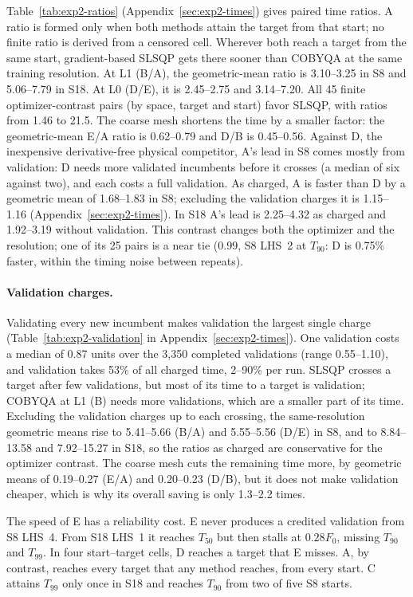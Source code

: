 Table~\ref{tab:exp2-ratios} (Appendix~\ref{sec:exp2-times}) gives paired time ratios. A ratio is formed
only when both methods attain the target from that start; no finite ratio
is derived from a censored cell. Wherever both reach a target from the
same start, gradient-based SLSQP gets there sooner than COBYQA at the same
training resolution. At L1 (B/A), the geometric-mean ratio is 3.10--3.25 in
S8 and 5.06--7.79 in S18. At L0 (D/E), it is 2.45--2.75 and
3.14--7.20.
All 45 finite optimizer-contrast pairs (by space, target and start) favor
SLSQP, with ratios from 1.46 to 21.5. The coarse mesh shortens the time by
a smaller factor: the geometric-mean E/A ratio is 0.62--0.79 and D/B is
0.45--0.56. Against D, the inexpensive derivative-free physical
competitor, A's lead in S8 comes mostly from validation: D needs more
validated incumbents before it crosses (a median of six against two), and
each costs a full validation. As charged, A is faster than D by a
geometric mean of 1.68--1.83 in S8; excluding the validation charges it is
1.15--1.16 (Appendix~\ref{sec:exp2-times}). In S18 A's lead is 2.25--4.32
as charged and 1.92--3.19 without validation. This contrast changes
both the optimizer and the resolution; one of its 25 pairs is a near tie
(0.99, S8 LHS~2 at $T_{90}$: D is 0.75\% faster, within the timing noise
between repeats).

\paragraph{Validation charges.}
Validating every new incumbent makes validation the largest single
charge (Table~\ref{tab:exp2-validation} in Appendix~\ref{sec:exp2-times}). One validation costs a median of
0.87 units over the 3,350 completed validations (range 0.55--1.10), and
validation takes 53\% of all charged time, 2--90\% per run. SLSQP crosses
a target after few validations, but most of its time to a target is
validation; COBYQA at L1 (B) needs more validations, which are a smaller
part of its time. Excluding the validation charges up to each crossing, the
same-resolution geometric means rise to 5.41--5.66 (B/A) and 5.55--5.56
(D/E) in S8, and to 8.84--13.58 and 7.92--15.27 in S18, so the
ratios as charged are conservative for the optimizer contrast. The coarse
mesh cuts the remaining time more, by geometric means of 0.19--0.27 (E/A)
and 0.20--0.23 (D/B), but it does not make validation cheaper, which is why
its overall saving is only 1.3--2.2 times.

The speed of E has a reliability cost. E never produces a credited
validation from S8 LHS~4. From S18 LHS~1 it reaches $T_{50}$ but
then stalls at $0.28F_0$, missing $T_{90}$ and $T_{99}$. In four
start--target cells, D reaches a target that E misses. A, by contrast,
reaches every target that any method reaches, from every start. C attains
$T_{99}$ only once in S18 and reaches $T_{90}$ from two of five
S8 starts.

